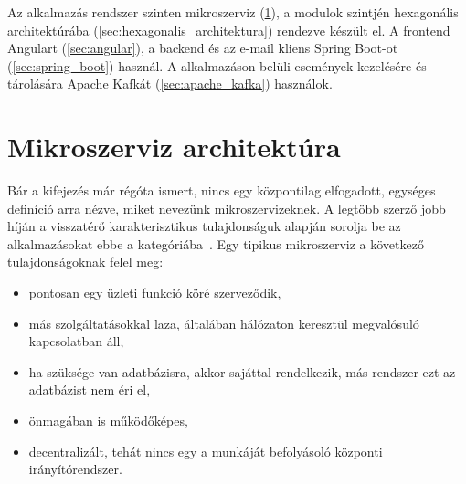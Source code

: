 Az alkalmazás rendszer szinten mikroszerviz (\ref{sec:mikroszerviz}), a modulok szintjén hexagonális architektúrába (\ref{sec:hexagonalis_architektura}) rendezve készült el. A frontend Angulart (\ref{sec:angular}), a backend és az e-mail kliens Spring Boot-ot (\ref{sec:spring_boot}) használ. A alkalmazáson belüli események kezelésére és tárolására Apache Kafkát (\ref{sec:apache_kafka}) használok.


\section{Mikroszerviz architektúra}\label{sec:mikroszerviz}
Bár a kifejezés már régóta ismert, nincs egy központilag elfogadott, egységes definíció arra nézve, miket nevezünk mikroszervizeknek. A legtöbb szerző jobb híján a visszatérő karakterisztikus tulajdonságuk alapján sorolja be az alkalmazásokat ebbe a kategóriába~\cite{OReally_Microservice_Architecture}. Egy tipikus mikroszerviz a következő tulajdonságoknak felel meg:

\begin{itemize}
	\item	pontosan egy üzleti funkció köré szerveződik,
	\item   más	szolgáltatásokkal laza, általában hálózaton keresztül megvalósuló kapcsolatban áll,
	\item   ha szüksége van adatbázisra, akkor sajáttal rendelkezik, más rendszer ezt az adatbázist nem éri el,
	\item	önmagában is működőképes,
	\item	decentralizált, tehát nincs egy a munkáját befolyásoló központi irányítórendszer.
\end{itemize}

